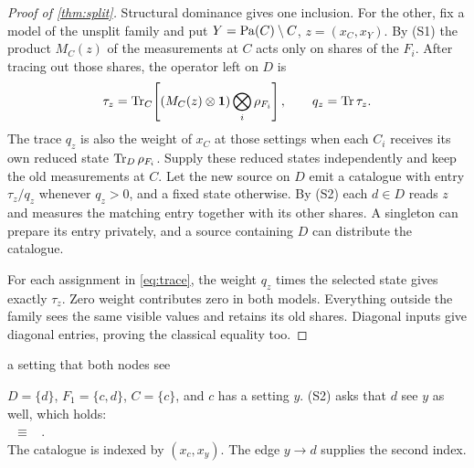 \begin{proof}[Proof of \cref{thm:split}]
Structural dominance gives one inclusion. For the other, fix a model of the unsplit family and put
$Y=\mathrm{Pa}(C)\setminus C$, $z=(x_C,x_Y)$. By (S1) the product $M_C(z)$ of the measurements at $C$
acts only on shares of the $F_i$. After tracing out those shares, the operator left on $D$ is
\[
 \tau_z=\operatorname{Tr}_C\!\left[(M_C(z)\otimes\mathbf{1})\bigotimes_i\rho_{F_i}\right],
 \qquad q_z=\operatorname{Tr}\tau_z.
\]
The trace $q_z$ is also the weight of $x_C$ at those settings when each $C_i$ receives its own reduced
state $\operatorname{Tr}_D\rho_{F_i}$. Supply these reduced states independently and keep the old measurements at $C$.
Let the new source on $D$ emit a catalogue with entry $\tau_z/q_z$ whenever $q_z>0$, and a fixed state
otherwise. By (S2) each $d\in D$ reads $z$ and measures the matching entry together with its other shares.
A singleton can prepare its entry privately, and a source containing $D$ can distribute the catalogue.

For each assignment in \cref{eq:trace}, the weight $q_z$ times the selected state gives exactly $\tau_z$.
Zero weight contributes zero in both models. Everything outside the family sees the same visible values
and retains its old shares. Diagonal inputs give diagonal entries, proving the classical equality too.
\end{proof}

\begin{validbox}[label=ex:setting]{a setting that both nodes see}
\begin{minipage}{0.55\linewidth}
$D=\{d\}$, $F_1=\{c,d\}$, $C=\{c\}$, and $c$ has a setting $y$. (S2) asks that $d$ see $y$ as well, which
holds:\\[3pt]
 \ $\equiv$ \ .\\[3pt]
The catalogue is indexed by $(x_c,x_y)$. The edge $y\to d$ supplies the second index.
\end{minipage}\hfill
\begin{minipage}{0.42\linewidth}\centering
{}
\end{minipage}
\end{validbox}

